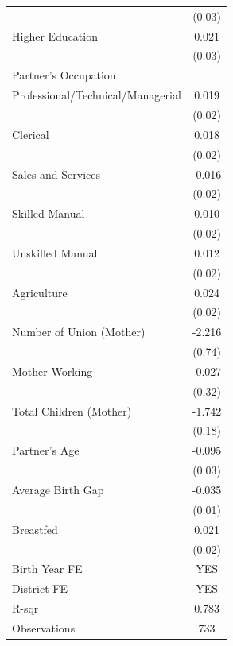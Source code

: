 \begin{longtable}{l*{1}{c}}
                    & (0.03) \\
\hspace{1em}Higher Education & 0.021 \\
                    & (0.03) \\
\multicolumn{2}{l}{Partner's Occupation} \\
\hspace{1em}Professional/Technical/Managerial & 0.019 \\
                    & (0.02) \\
\hspace{1em}Clerical & 0.018 \\
                    & (0.02) \\
\hspace{1em}Sales and Services & -0.016 \\
                    & (0.02) \\
\hspace{1em}Skilled Manual & 0.010 \\
                    & (0.02) \\
\hspace{1em}Unskilled Manual & 0.012 \\
                    & (0.02) \\
\hspace{1em}Agriculture & 0.024 \\
                    & (0.02) \\
Number of Union (Mother) & -2.216\sym{***} \\
                    & (0.74) \\
Mother Working & -0.027 \\
                    & (0.32) \\
Total Children (Mother) & -1.742\sym{***} \\
                    & (0.18) \\
Partner's Age & -0.095\sym{***} \\
                    & (0.03) \\
Average Birth Gap & -0.035\sym{***} \\
                    & (0.01) \\
Breastfed & 0.021 \\
                    & (0.02) \\
\hline
Birth Year FE & YES \\
District FE & YES \\
R-sqr & 0.783 \\
Observations & 733 \\
\hline\hline
\end{longtable}